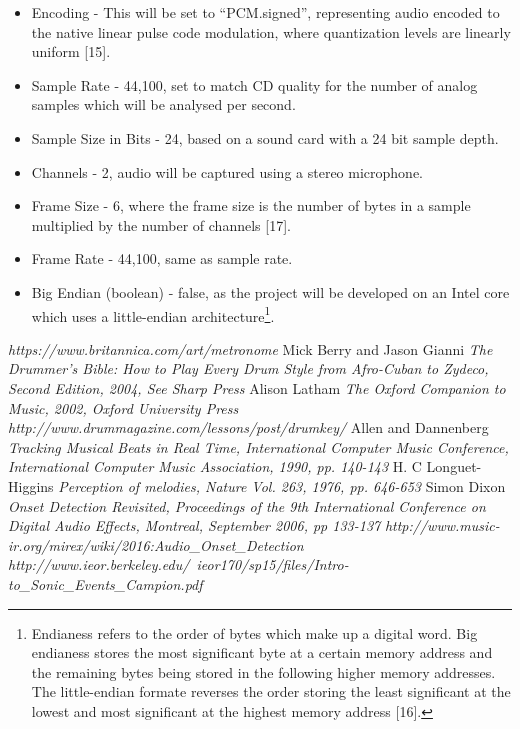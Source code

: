 \documentclass[a4paper, 11pt]{article}
\begin{document}
\begin{itemize}
\item Encoding - This will be set to ``PCM.signed'', representing audio encoded to the native linear pulse code modulation, where quantization levels are linearly uniform [15].
\item Sample Rate - 44,100, set to match CD quality for the number of analog samples which will be analysed per second. 
\item Sample Size in Bits - 24, based on a sound card with a 24 bit sample depth.
\item Channels - 2, audio will be captured using a stereo microphone.
\item Frame Size - 6, where the frame size is the number of bytes in a sample multiplied by the number of channels [17].
\item Frame Rate - 44,100, same as sample rate.
\item Big Endian (boolean) - false, as the project will be developed on an Intel core which uses a little-endian architecture\footnote{Endianess refers to the order of bytes which make up a digital word. Big endianess stores the most significant byte at a certain memory address and the remaining bytes being stored in the following higher memory addresses. The little-endian formate reverses the order storing the least significant at the lowest and most significant at the highest memory address [16].}.
\end{itemize}




\begin{thebibliography}{99}
\textit{https://www.britannica.com/art/metronome}
Mick Berry and Jason Gianni
\textit{The Drummer's Bible: How to Play Every Drum Style from Afro-Cuban to Zydeco, Second Edition, 2004, See Sharp Press}
Alison Latham
\textit{The Oxford Companion to Music, 2002, Oxford University Press}
\textit{http://www.drummagazine.com/lessons/post/drumkey/}
Allen and Dannenberg
\textit{Tracking Musical Beats in Real Time, International Computer Music Conference, International Computer Music Association, 1990, pp. 140-143}
H. C Longuet-Higgins
\textit{Perception of melodies, Nature Vol. 263, 1976, pp. 646-653}
Simon Dixon
\textit{Onset Detection Revisited, Proceedings of the 9th International Conference on Digital Audio Effects, Montreal, September 2006, pp 133-137}
\textit{http://www.music-ir.org/mirex/wiki/2016:Audio\_Onset\_Detection}
\textit{http://www.ieor.berkeley.edu/~ieor170/sp15/files/Intro-to\_Sonic\_Events\_Campion.pdf}

\end{thebibliography}
\end{document}
